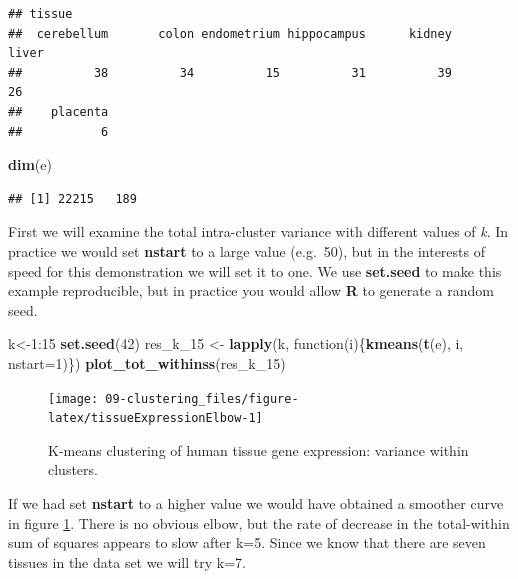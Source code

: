 \documentclass[]{book}
\newenvironment{Shaded}{\begin{snugshade}}{\end{snugshade}}
\newcommand{\KeywordTok}[1]{\textcolor[rgb]{0.13,0.29,0.53}{\textbf{{#1}}}}
\newcommand{\DataTypeTok}[1]{\textcolor[rgb]{0.13,0.29,0.53}{{#1}}}
\newcommand{\DecValTok}[1]{\textcolor[rgb]{0.00,0.00,0.81}{{#1}}}
\newcommand{\StringTok}[1]{\textcolor[rgb]{0.31,0.60,0.02}{{#1}}}
\newcommand{\NormalTok}[1]{{#1}}
\theoremstyle{definition}
\theoremstyle{definition}
\theoremstyle{definition}
\theoremstyle{remark}
\begin{document}
\begin{verbatim}
## tissue
##  cerebellum       colon endometrium hippocampus      kidney       liver 
##          38          34          15          31          39          26 
##    placenta 
##           6
\end{verbatim}

\begin{Shaded}
\begin{Highlighting}[]
\KeywordTok{dim}\NormalTok{(e)}
\end{Highlighting}
\end{Shaded}

\begin{verbatim}
## [1] 22215   189
\end{verbatim}

First we will examine the total intra-cluster variance with different
values of \emph{k}. In practice we would set \textbf{nstart} to a large
value (e.g.~50), but in the interests of speed for this demonstration we
will set it to one. We use \textbf{set.seed} to make this example
reproducible, but in practice you would allow \textbf{R} to generate a
random seed.

\begin{Shaded}
\begin{Highlighting}[]
\NormalTok{k<-}\DecValTok{1}\NormalTok{:}\DecValTok{15}
\KeywordTok{set.seed}\NormalTok{(}\DecValTok{42}\NormalTok{)}
\NormalTok{res_k_15 <-}\StringTok{ }\KeywordTok{lapply}\NormalTok{(k, function(i)\{}\KeywordTok{kmeans}\NormalTok{(}\KeywordTok{t}\NormalTok{(e), i, }\DataTypeTok{nstart=}\DecValTok{1}\NormalTok{)\})}
\KeywordTok{plot_tot_withinss}\NormalTok{(res_k_15)}
\end{Highlighting}
\end{Shaded}

\begin{figure}

{\centering \texttt{[image: 09-clustering\_files/figure-latex/tissueExpressionElbow-1]} 

}

\caption{K-means clustering of human tissue gene expression: variance within clusters.}\label{fig:tissueExpressionElbow}
\end{figure}

If we had set \textbf{nstart} to a higher value we would have obtained a
smoother curve in figure \ref{fig:tissueExpressionElbow}. There is no
obvious elbow, but the rate of decrease in the total-within sum of
squares appears to slow after k=5. Since we know that there are seven
tissues in the data set we will try k=7.
\end{document}
